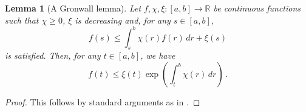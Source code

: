 \documentclass[11pt,leqno,textwidth=10cm]{amsart}
\numberwithin{equation}{section}
\theoremstyle{definition}
\theoremstyle{plain}
\newtheorem{lemma}[definition]{Lemma}
\newcommand{\1}{\mathbbm{1}}
\newcommand{\R}{\mathbb{R}}
\begin{document}
\begin{lemma}[A Gronwall lemma]\label{lem:gronwall} Let $f,\chi,\xi:[a,b]\longrightarrow \R$ be continuous functions such that $\chi\geq 0$, $\xi$ is decreasing and, for any $s\in[a,b]$,
\[f(s)\leq \int_s^b\chi(r)f(r)\,dr+\xi(s)\]
is satisfied. Then, for any $t\in[a,b]$, we have
\[f(t)\leq \xi(t)\exp\left(\int_t^b\chi(r)\,dr\right)\,.\]
\end{lemma}
\begin{proof}
This follows by standard arguments as in \cite[Corollary 2-3]{Dra03}.%
\end{proof}
\end{document}
